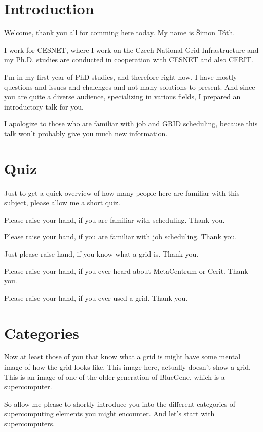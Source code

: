 \documentclass[10pt]{article}
\begin{document}
\section{Introduction}

Welcome, thank you all for comming here today.
My name is Šimon Tóth.

I work for CESNET, where I work on the Czech National Grid Infrastructure 
and my Ph.D. studies are conducted in cooperation with CESNET and also CERIT.

I'm in my first year of PhD studies, and therefore right now, I have mostly
questions and issues and chalenges and not many solutions to present.  And
since you are quite a diverse audience, specializing in various fields, I
prepared an introductory talk for you.

I apologize to those who are familiar with job and GRID scheduling, because
this talk won't probably give you much new information.

\section{Quiz}

Just to get a quick overview of how many people here are familiar with this
subject, please allow me a short quiz.

Please raise your hand, if you are familiar with scheduling. Thank you.

Please raise your hand, if you are familiar with job scheduling. Thank you.

Just please raise hand, if you know what a grid is. Thank you.

Please raise your hand, if you ever heard about MetaCentrum or Cerit. Thank you.

Please raise your hand, if you ever used a grid. Thank you.

\section{Categories}

Now at least those of you that know what a grid is might have some mental image
of how the grid looks like.  This image here, actually doesn't show a grid.
This is an image of one of the older generation of BlueGene, which is a
supercomputer.

So allow me please to shortly introduce you into the different categories of
supercomputing elements you might encounter.  And let's start with
supercomputers.
\end{document}
